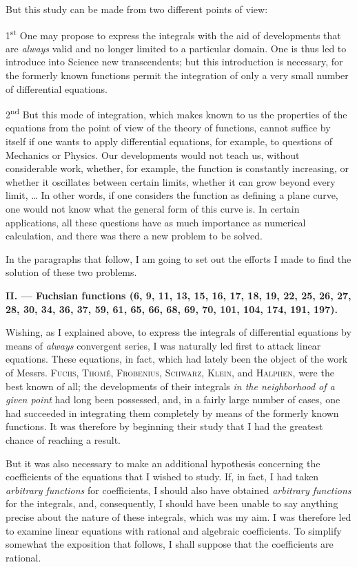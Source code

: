 \documentclass[11pt]{article}
\begin{document}
But this study can be made from two different points of view:

1\textsuperscript{st} One may propose to express the integrals with the aid of developments that are \emph{always} valid and no longer limited to a particular domain. One is thus led to introduce into Science new transcendents; but this introduction is necessary, for the formerly known functions permit the integration of only a very small number of differential equations.

2\textsuperscript{nd} But this mode of integration, which makes known to us the properties of the equations from the point of view of the theory of functions, cannot suffice by itself if one wants to apply differential equations, for example, to questions of Mechanics or Physics. Our developments would not teach us, without considerable work, whether, for example, the function is constantly increasing, or whether it oscillates between certain limits, whether it can grow beyond every limit, \ldots{} In other words, if one considers the function as defining a plane curve, one would not know what the general form of this curve is. In certain applications, all these questions have as much importance as numerical calculation, and there was there a new problem to be solved.

In the paragraphs that follow, I am going to set out the efforts I made to find the solution of these two problems.


\begin{center}
\textbf{II. — Fuchsian functions (6, 9, 11, 13, 15, 16, 17, 18, 19, 22, 25, 26, 27, 28, 30, 34, 36, 37, 59, 61, 65, 66, 68, 69, 70, 101, 104, 174, 191, 197).}
\end{center}

Wishing, as I explained above, to express the integrals of differential equations by means of \emph{always} convergent series, I was naturally led first to attack linear equations. These equations, in fact, which had lately been the object of the work of Messrs. \textsc{Fuchs}, \textsc{Thomé}, \textsc{Frobenius}, \textsc{Schwarz}, \textsc{Klein}, and \textsc{Halphen}, were the best known of all; the developments of their integrals \emph{in the neighborhood of a given point} had long been possessed, and, in a fairly large number of cases, one had succeeded in integrating them completely by means of the formerly known functions. It was therefore by beginning their study that I had the greatest chance of reaching a result.

But it was also necessary to make an additional hypothesis concerning the coefficients of the equations that I wished to study. If, in fact, I had taken \emph{arbitrary functions} for coefficients, I should also have obtained \emph{arbitrary functions} for the integrals, and, consequently, I should have been unable to say anything precise about the nature of these integrals, which was my aim. I was therefore led to examine linear equations with rational and algebraic coefficients. To simplify somewhat the exposition that follows, I shall suppose that the coefficients are rational.
\end{document}
